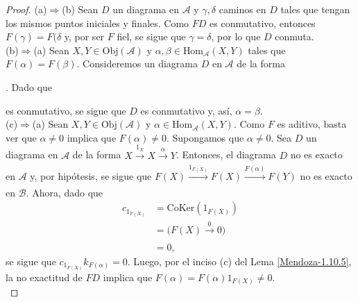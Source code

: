 \documentclass[tesis]{subfiles}
\begin{document}
\begin{proof}\leavevmode

    (a)$\Rightarrow$(b) Sean $D$ un diagrama en $\mathscr{A}$ y $\gamma,\delta$ caminos en $D$ tales que tengan los mismos puntos iniciales y finales. Como $FD$ es conmutativo, entonces $F(\gamma)=F(\delta$ y, por ser $F$ fiel, se sigue que $\gamma=\delta$, por lo que $D$ conmuta. \\

    (b)$\Rightarrow$(a) Sean $X,Y\in\text{Obj}(\mathscr{A})$ y $\alpha,\beta\in\text{Hom}_\mathscr{A}(X,Y)$ tales que $F(\alpha)=F(\beta)$. Consideremos un diagrama $D$ en $\mathscr{A}$ de la forma . Dado que  es conmutativo, se sigue que $D$ es conmutativo y, así, $\alpha=\beta$. \\

    (c)$\Rightarrow$(a) Sean $X,Y\in\text{Obj}(\mathscr{A})$ y $\alpha\in\text{Hom}_\mathscr{A}(X,Y)$. Como $F$ es aditivo, basta ver que $\alpha\neq0$ implica que $F(\alpha)\neq0$. Supongamos que $\alpha\neq0$. Sea $D$ un diagrama en $\mathscr{A}$ de la forma $X\xrightarrow[]{1_X} X\xrightarrow[]{\alpha} Y$. Entonces, el diagrama $D$ no es exacto en $\mathscr{A}$ y, por hipótesis, se sigue que $F(X)\xrightarrow[]{1_{F(X)}} F(X)\xrightarrow[]{F(\alpha)} F(Y)$ no es exacto en $\mathscr{B}$. Ahora, dado que
    \begin{align*}
        c_{1_{F(X)}} &= \text{CoKer}(1_{F(X)}) \\
                     &= \big( F(X)\xrightarrow[]{0} 0\big) \\
                     &= 0,
    \end{align*}
    se sigue que $c_{1_{F(X)}}k_{F(\alpha)}=0$. Luego, por el inciso (c) del Lema \ref{Mendoza-1.10.5}, la no exactitud de $FD$ implica que $F(\alpha) = F(\alpha)1_{F(X)}\neq0$. \\


\end{proof}
\end{document}
